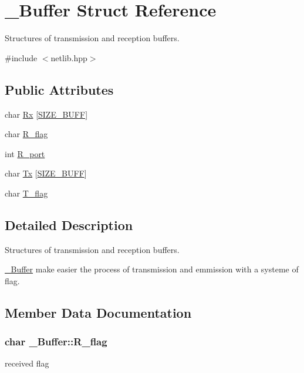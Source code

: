 \hypertarget{struct___buffer}{}\section{\+\_\+\+Buffer Struct Reference}
\label{struct___buffer}


Structures of transmission and reception buffers.  




{\ttfamily \#include $<$netlib.\+hpp$>$}

\subsection*{Public Attributes}
\begin{DoxyCompactItemize}
\item 
char \hyperlink{struct___buffer_a8c44c403d9e3f8ddefd09d410312375b}{Rx} \mbox{[}\hyperlink{netlib_8hpp_afecd0d3dfa9d17ffdc75f686ea643d9b}{S\+I\+Z\+E\+\_\+\+B\+U\+FF}\mbox{]}
\item 
char \hyperlink{struct___buffer_a1a0a34a8fecf0f33a37bc1fe856859db}{R\+\_\+flag}
\item 
int \hyperlink{struct___buffer_a7f498f79ab3e8c70f43d929bda912bfc}{R\+\_\+port}
\item 
char \hyperlink{struct___buffer_a803fdcb8a3d9d6358bf64aa8b311cb80}{Tx} \mbox{[}\hyperlink{netlib_8hpp_afecd0d3dfa9d17ffdc75f686ea643d9b}{S\+I\+Z\+E\+\_\+\+B\+U\+FF}\mbox{]}
\item 
char \hyperlink{struct___buffer_a458c1db99177167836af8505dea8bae3}{T\+\_\+flag}
\end{DoxyCompactItemize}


\subsection{Detailed Description}
Structures of transmission and reception buffers. 

\hyperlink{struct___buffer}{\+\_\+\+Buffer} make easier the process of transmission and emmission with a systeme of flag. 

\subsection{Member Data Documentation}
\subsubsection[{\texorpdfstring{R\+\_\+flag}{R_flag}}]{\setlength{\rightskip}{0pt plus 5cm}char \+\_\+\+Buffer\+::\+R\+\_\+flag}\hypertarget{struct___buffer_a1a0a34a8fecf0f33a37bc1fe856859db}{}\label{struct___buffer_a1a0a34a8fecf0f33a37bc1fe856859db}
received flag 
